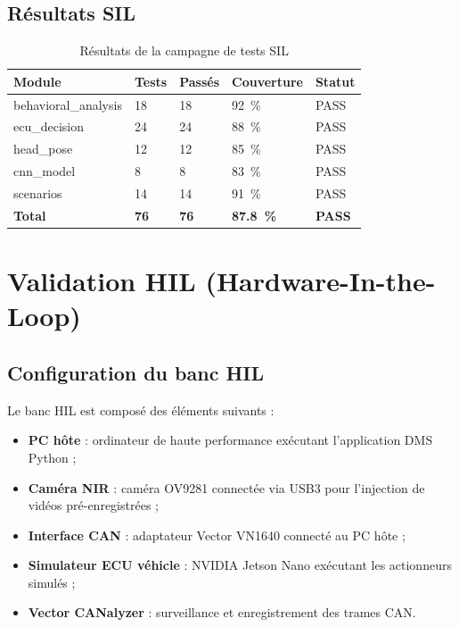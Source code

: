 \documentclass[12pt,a4paper]{report}
\begin{document}
\subsection{R\'esultats SIL}

\begin{table}[H]
\centering
\caption{R\'esultats de la campagne de tests SIL}
\label{tab:sil_results}
\begin{tabular}{L{3.5cm} C{2cm} C{2cm} C{2.5cm} C{1.5cm}}
\toprule
\textbf{Module} & \textbf{Tests} & \textbf{Pass\'es} & \textbf{Couverture} & \textbf{Statut} \\
\midrule
behavioral\_analysis & 18 & 18 & 92~\% & PASS \\
ecu\_decision & 24 & 24 & 88~\% & PASS \\
head\_pose & 12 & 12 & 85~\% & PASS \\
cnn\_model & 8 & 8 & 83~\% & PASS \\
scenarios & 14 & 14 & 91~\% & PASS \\
\textbf{Total} & \textbf{76} & \textbf{76} & \textbf{87.8~\%} & \textbf{PASS} \\
\bottomrule
\end{tabular}
\end{table}

\section{Validation HIL (Hardware-In-the-Loop)}

\subsection{Configuration du banc HIL}

Le banc HIL est compos\'e des \'el\'ements suivants :
\begin{itemize}
  \item \textbf{PC h\^ote} : ordinateur de haute performance ex\'ecutant l'application DMS Python ;
  \item \textbf{Cam\'era NIR} : cam\'era OV9281 connect\'ee via USB3 pour l'injection de vid\'eos pr\'e-enregistr\'ees ;
  \item \textbf{Interface CAN} : adaptateur Vector VN1640 connect\'e au PC h\^ote ;
  \item \textbf{Simulateur ECU v\'ehicle} : NVIDIA Jetson Nano ex\'ecutant les actionneurs simul\'es ;
  \item \textbf{Vector CANalyzer} : surveillance et enregistrement des trames CAN.
\end{itemize}
\end{document}
